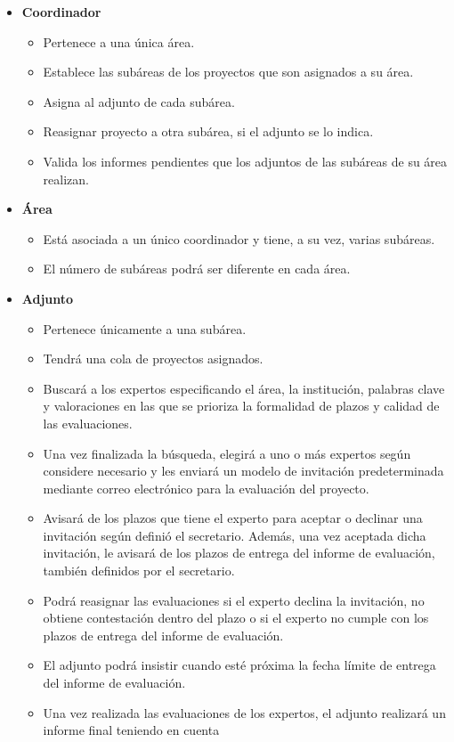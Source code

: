 \documentclass[a4paper,12pt,spanish,twoside]{article}
\begin{document}
\begin{itemize}
\begin{itemize}
\end{itemize}
\item \textbf{Coordinador}
\begin{itemize}
\item Pertenece a una única área.
\item Establece las subáreas de los proyectos que son asignados a su área.
\item Asigna al adjunto de cada subárea.
\item Reasignar proyecto a otra subárea, si el adjunto se lo indica.
\item Valida los informes pendientes que los adjuntos de las subáreas de su área realizan.
\end{itemize}
\item \textbf{Área}
\begin{itemize}
\item Está asociada a un único coordinador y tiene, a su vez, varias subáreas. 
\item El número de subáreas podrá ser diferente en cada área.
\end{itemize}
\item \textbf{Adjunto}
\begin{itemize}
\item Pertenece únicamente a una subárea.
\item Tendrá una cola de proyectos asignados.
\item Buscará a los expertos especificando el área, la institución, palabras clave y valoraciones 
en las que se prioriza la formalidad de plazos y calidad de las evaluaciones.
\item Una vez finalizada la búsqueda, elegirá a uno o más expertos según considere necesario y les enviará 
un modelo de invitación predeterminada mediante correo electrónico para la  evaluación del proyecto. 
\item Avisará de los plazos que tiene el experto para aceptar o declinar una invitación según definió el 
secretario. Además, una vez aceptada dicha invitación, le avisará de los plazos de entrega del informe 
de evaluación, también definidos por el secretario.
\item Podrá reasignar las evaluaciones si el experto declina la invitación, no obtiene contestación dentro 
del plazo o si el experto no cumple con los plazos de entrega del informe de evaluación.
\item El adjunto podrá insistir cuando esté próxima la fecha límite de entrega del informe de evaluación.
\item Una vez realizada las evaluaciones de los expertos, el adjunto realizará un informe final teniendo en cuenta 

\end{itemize}
\end{itemize}
\end{document}

